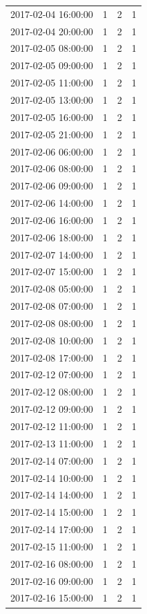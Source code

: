 \begin{tabular}{lrrr}
2017-02-04 16:00:00 & 1 & 2 & 1 \\
2017-02-04 20:00:00 & 1 & 2 & 1 \\
2017-02-05 08:00:00 & 1 & 2 & 1 \\
2017-02-05 09:00:00 & 1 & 2 & 1 \\
2017-02-05 11:00:00 & 1 & 2 & 1 \\
2017-02-05 13:00:00 & 1 & 2 & 1 \\
2017-02-05 16:00:00 & 1 & 2 & 1 \\
2017-02-05 21:00:00 & 1 & 2 & 1 \\
2017-02-06 06:00:00 & 1 & 2 & 1 \\
2017-02-06 08:00:00 & 1 & 2 & 1 \\
2017-02-06 09:00:00 & 1 & 2 & 1 \\
2017-02-06 14:00:00 & 1 & 2 & 1 \\
2017-02-06 16:00:00 & 1 & 2 & 1 \\
2017-02-06 18:00:00 & 1 & 2 & 1 \\
2017-02-07 14:00:00 & 1 & 2 & 1 \\
2017-02-07 15:00:00 & 1 & 2 & 1 \\
2017-02-08 05:00:00 & 1 & 2 & 1 \\
2017-02-08 07:00:00 & 1 & 2 & 1 \\
2017-02-08 08:00:00 & 1 & 2 & 1 \\
2017-02-08 10:00:00 & 1 & 2 & 1 \\
2017-02-08 17:00:00 & 1 & 2 & 1 \\
2017-02-12 07:00:00 & 1 & 2 & 1 \\
2017-02-12 08:00:00 & 1 & 2 & 1 \\
2017-02-12 09:00:00 & 1 & 2 & 1 \\
2017-02-12 11:00:00 & 1 & 2 & 1 \\
2017-02-13 11:00:00 & 1 & 2 & 1 \\
2017-02-14 07:00:00 & 1 & 2 & 1 \\
2017-02-14 10:00:00 & 1 & 2 & 1 \\
2017-02-14 14:00:00 & 1 & 2 & 1 \\
2017-02-14 15:00:00 & 1 & 2 & 1 \\
2017-02-14 17:00:00 & 1 & 2 & 1 \\
2017-02-15 11:00:00 & 1 & 2 & 1 \\
2017-02-16 08:00:00 & 1 & 2 & 1 \\
2017-02-16 09:00:00 & 1 & 2 & 1 \\
2017-02-16 15:00:00 & 1 & 2 & 1 \\

\end{tabular}
